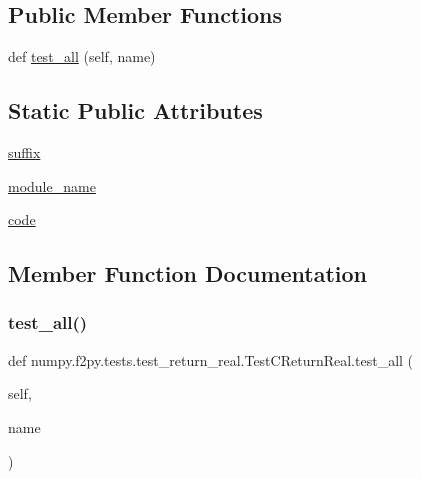 \subsection*{Public Member Functions}
\begin{DoxyCompactItemize}
\item 
def \hyperlink{classnumpy_1_1f2py_1_1tests_1_1test__return__real_1_1TestCReturnReal_a3ea0c872900c708ce9608c96248f2c12}{test\+\_\+all} (self, name)
\end{DoxyCompactItemize}
\subsection*{Static Public Attributes}
\begin{DoxyCompactItemize}
\item 
\hyperlink{classnumpy_1_1f2py_1_1tests_1_1test__return__real_1_1TestCReturnReal_afb5789a4269970175e0624790c8f023a}{suffix}
\item 
\hyperlink{classnumpy_1_1f2py_1_1tests_1_1test__return__real_1_1TestCReturnReal_a851b3dddef22a4f40e7e6e30f78b6d03}{module\+\_\+name}
\item 
\hyperlink{classnumpy_1_1f2py_1_1tests_1_1test__return__real_1_1TestCReturnReal_a7c110f31fbabfc195bc61f91c3933863}{code}
\end{DoxyCompactItemize}


\subsection{Member Function Documentation}
\mbox{\label{classnumpy_1_1f2py_1_1tests_1_1test__return__real_1_1TestCReturnReal_a3ea0c872900c708ce9608c96248f2c12}} 
\subsubsection{\texorpdfstring{test\+\_\+all()}{test\_all()}}
{\footnotesize\ttfamily def numpy.\+f2py.\+tests.\+test\+\_\+return\+\_\+real.\+Test\+C\+Return\+Real.\+test\+\_\+all (\begin{DoxyParamCaption}\item[{}]{self,  }\item[{}]{name }\end{DoxyParamCaption})}



